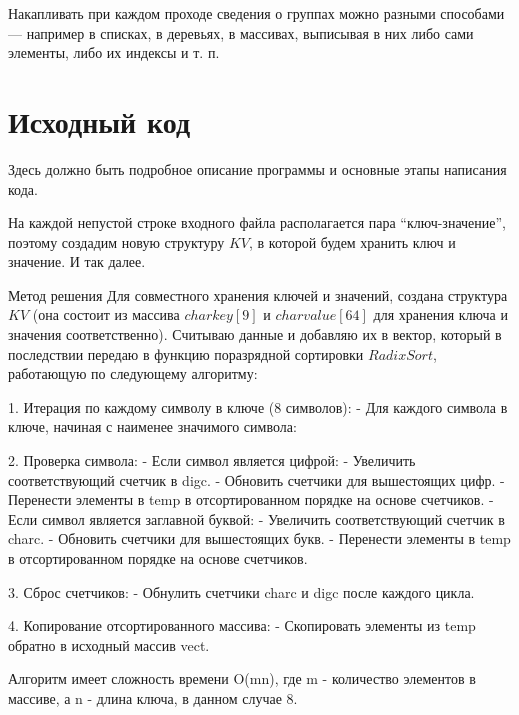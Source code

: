 \documentclass[pdf, unicode, 12pt, a4paper,oneside,fleqn]{article}
\begin{document}
Накапливать при каждом проходе сведения о группах можно разными способами — например в списках, в деревьях, в массивах, выписывая в них либо сами элементы, либо их индексы и т. п.

\pagebreak

\section{Исходный код}
Здесь должно быть подробное описание программы и основные этапы написания кода.

На каждой непустой строке входного файла располагается пара \enquote{ключ-значение}, поэтому создадим новую 
структуру $KV$, в которой будем хранить ключ и значение. И так далее.

Метод решения
Для совместного хранения ключей и значений, создана структура $KV$ (она состоит из массива $char key[9]$ и $char value[64]$ для хранения ключа и значения соответственно). Считываю данные и добавляю их в вектор, который в последствии передаю в функцию поразрядной сортировки $RadixSort$, работающую по следующему алгоритму:

1. Итерация по каждому символу в ключе (8 символов):
   - Для каждого символа в ключе, начиная с наименее значимого символа:

2. Проверка символа:
   - Если символ является цифрой:
     - Увеличить соответствующий счетчик в digc.
     - Обновить счетчики для вышестоящих цифр.
     - Перенести элементы в temp в отсортированном порядке на основе счетчиков.
   - Если символ является заглавной буквой:
     - Увеличить соответствующий счетчик в charc.
     - Обновить счетчики для вышестоящих букв.
     - Перенести элементы в temp в отсортированном порядке на основе счетчиков.

3. Сброс счетчиков:
   - Обнулить счетчики charc и digc после каждого цикла.

4. Копирование отсортированного массива:
   - Скопировать элементы из temp обратно в исходный массив vect.

Алгоритм имеет сложность времени O(mn), где m - количество элементов в массиве, а n - длина ключа, в данном случае 8.
\end{document}

